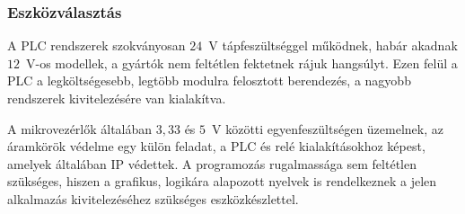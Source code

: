 \subsubsection{Eszközválasztás}

A PLC rendszerek szokványosan $24$~V tápfeszültséggel működnek, habár akadnak $12$~V-os modellek, a gyártók nem feltétlen fektetnek rájuk hangsúlyt. Ezen felül a PLC a legköltségesebb, legtöbb modulra felosztott berendezés, a nagyobb rendszerek kivitelezésére van kialakítva.

A mikrovezérlők általában $3,33$ és $5$~V közötti egyenfeszültségen üzemelnek, az áramkörök védelme egy külön feladat, a PLC és relé kialakításokhoz képest, amelyek általában IP védettek. A programozás rugalmassága sem feltétlen szükséges, hiszen a grafikus, logikára alapozott nyelvek is rendelkeznek a jelen alkalmazás kivitelezéséhez szükséges eszközkészlettel.

